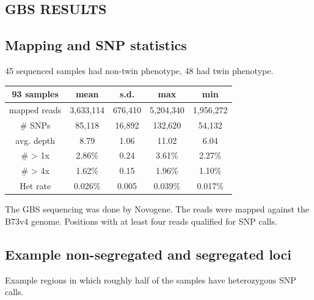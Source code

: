 \documentclass[maize,portrait]{a0poster}
\begin{document}
\begin{multicols}{3}
  \section*{GBS RESULTS}

  \subsection*{Mapping and SNP statistics}

  45 sequenced samples had non-twin phenotype, 48 had twin phenotype.
  
  \begin{center}
    \small
    \begin{tabular}{|c|c|c|c|c|}
      \hline
      93 samples & mean & s.d. & max & min \\
      \hline
      mapped reads & 3,633,114 & 676,410 & 5,204,340 & 1,956,272 \\
      \# SNPs & 85,118 & 16,892 & 132,620 & 54,132 \\
      avg. depth & 8.79 & 1.06 & 11.02 & 6.04 \\
      \# > 1x & 2.86\% & 0.24 & 3.61\% & 2.27\% \\
      \# > 4x & 1.62\% & 0.15 & 1.96\% & 1.10\% \\
      Het rate & 0.026\% & 0.005 & 0.039\% & 0.017\% \\
      \hline
    \end{tabular}
  \end{center}

  The GBS sequencing was done by Novogene. The reads were mapped against the B73v4 genome. Positions with at least four reads qualified for SNP calls.

  \subsection*{Example non-segregated and segregated loci}

  Example regions in which roughly half of the samples have heterozygous SNP calls.
  

\end{multicols}
\end{document}
